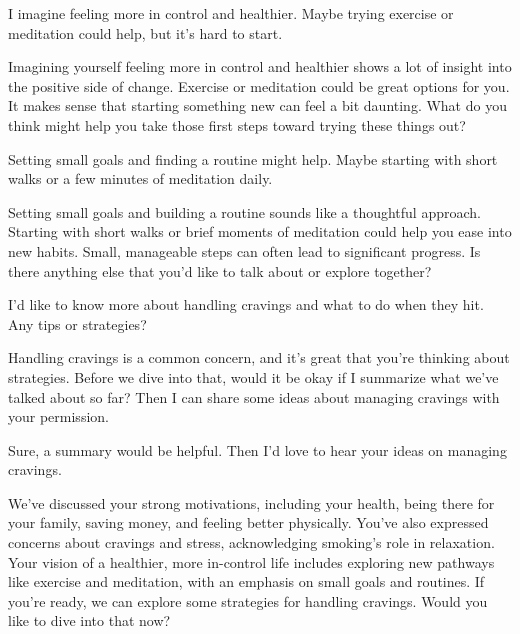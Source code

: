 \begin{clientbox}
	I imagine feeling more in control and healthier. Maybe trying exercise or meditation could help, but it's hard to start.
\end{clientbox}

\begin{counsellorbox}
	Imagining yourself feeling more in control and healthier shows a lot of insight into the positive side of change. Exercise or meditation could be great options for you. It makes sense that starting something new can feel a bit daunting. What do you think might help you take those first steps toward trying these things out?
\end{counsellorbox}

\begin{clientbox}
	Setting small goals and finding a routine might help. Maybe starting with short walks or a few minutes of meditation daily.
\end{clientbox}

\begin{counsellorbox}
	Setting small goals and building a routine sounds like a thoughtful approach. Starting with short walks or brief moments of meditation could help you ease into new habits. Small, manageable steps can often lead to significant progress. Is there anything else that you’d like to talk about or explore together?
\end{counsellorbox}

\begin{clientbox}
	I'd like to know more about handling cravings and what to do when they hit. Any tips or strategies?
\end{clientbox}

\begin{counsellorbox}
	Handling cravings is a common concern, and it's great that you're thinking about strategies. Before we dive into that, would it be okay if I summarize what we've talked about so far? Then I can share some ideas about managing cravings with your permission.
\end{counsellorbox}

\begin{clientbox}
	Sure, a summary would be helpful. Then I'd love to hear your ideas on managing cravings.
\end{clientbox}

\begin{counsellorbox}
	We've discussed your strong motivations, including your health, being there for your family, saving money, and feeling better physically. You've also expressed concerns about cravings and stress, acknowledging smoking's role in relaxation. Your vision of a healthier, more in-control life includes exploring new pathways like exercise and meditation, with an emphasis on small goals and routines. If you're ready, we can explore some strategies for handling cravings. Would you like to dive into that now?
\end{counsellorbox}

